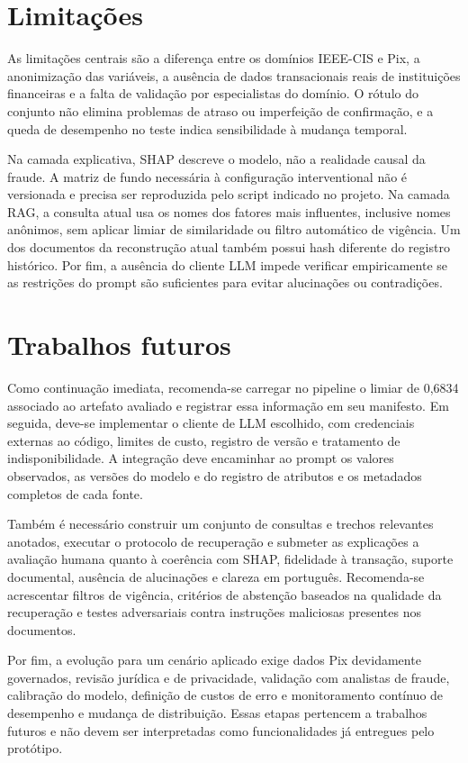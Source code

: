 \section{Limitações}

As limitações centrais são a diferença entre os domínios IEEE-CIS e Pix, a anonimização das variáveis, a ausência de dados transacionais reais de instituições financeiras e a falta de validação por especialistas do domínio. O rótulo do conjunto não elimina problemas de atraso ou imperfeição de confirmação, e a queda de desempenho no teste indica sensibilidade à mudança temporal.

Na camada explicativa, SHAP descreve o modelo, não a realidade causal da fraude. A matriz de fundo necessária à configuração interventional não é versionada e precisa ser reproduzida pelo script indicado no projeto. Na camada RAG, a consulta atual usa os nomes dos fatores mais influentes, inclusive nomes anônimos, sem aplicar limiar de similaridade ou filtro automático de vigência. Um dos documentos da reconstrução atual também possui hash diferente do registro histórico. Por fim, a ausência do cliente LLM impede verificar empiricamente se as restrições do prompt são suficientes para evitar alucinações ou contradições.

\section{Trabalhos futuros}

Como continuação imediata, recomenda-se carregar no pipeline o limiar de 0,6834 associado ao artefato avaliado e registrar essa informação em seu manifesto. Em seguida, deve-se implementar o cliente de LLM escolhido, com credenciais externas ao código, limites de custo, registro de versão e tratamento de indisponibilidade. A integração deve encaminhar ao prompt os valores observados, as versões do modelo e do registro de atributos e os metadados completos de cada fonte.

Também é necessário construir um conjunto de consultas e trechos relevantes anotados, executar o protocolo de recuperação e submeter as explicações a avaliação humana quanto à coerência com SHAP, fidelidade à transação, suporte documental, ausência de alucinações e clareza em português. Recomenda-se acrescentar filtros de vigência, critérios de abstenção baseados na qualidade da recuperação e testes adversariais contra instruções maliciosas presentes nos documentos.

Por fim, a evolução para um cenário aplicado exige dados Pix devidamente governados, revisão jurídica e de privacidade, validação com analistas de fraude, calibração do modelo, definição de custos de erro e monitoramento contínuo de desempenho e mudança de distribuição. Essas etapas pertencem a trabalhos futuros e não devem ser interpretadas como funcionalidades já entregues pelo protótipo.

